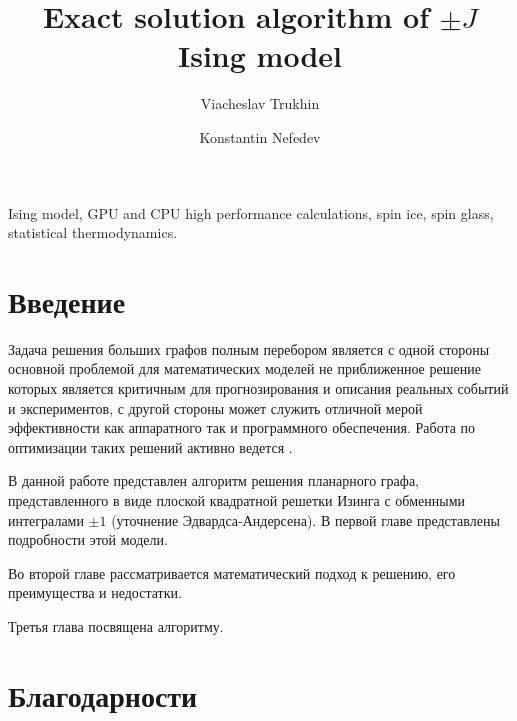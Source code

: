 \documentclass[utf8, babel, sor, jor, amsmath, amssymb, reprint]{elsarticle} %
\begin{document}
	
	\begin{frontmatter}
		
		
		\title{Exact solution algorithm of $\pm J$ Ising model}
		
		\author[mainaddress, secondaryaddress]{Viacheslav Trukhin}
		
		\author[mainaddress, secondaryaddress]{Konstantin Nefedev}
		
		\address[mainaddress]{Far Eastern Federal University, Vladivostok, Russky Island, 10 Ajax Bay, 690922, the Russian Federation}
		\address[secondaryaddress]{Institute of Applied Mathematics, Far Eastern Branch, Russian Academy of Science, Vladivostok, Radio 7, 690041, the Russian Federation}
		
		\begin{abstract}
			
			
		\end{abstract}
		
		
		\begin{keyword}
			Ising model, GPU and CPU high performance calculations, spin ice, spin glass, statistical thermodynamics.
			
		\end{keyword}
		
		
	\end{frontmatter}
	
	\linenumbers
	\newpage
	\tableofcontents
	
	\newpage
	\section{Введение}

	Задача решения больших графов полным перебором является с одной стороны основной проблемой для математических моделей не приближенное решение которых является критичным для прогнозирования и описания реальных событий и экспериментов, с другой стороны может служить отличной мерой эффективности как аппаратного так и программного обеспечения. Работа по оптимизации таких решений активно ведется \cite{romero2020high}. 
	
	В данной работе представлен алгоритм решения планарного графа, представленного в виде плоской квадратной решетки Изинга с обменными интегралами $\pm 1$ (уточнение Эдвардса-Андерсена). В первой главе представлены подробности этой модели.
	
	Во второй главе рассматривается математический подход к решению, его преимущества и недостатки.
	
	Третья глава посвящена алгоритму.
	
	
	\section{Благодарности}
	
	
	
	
	
	
\end{document}
